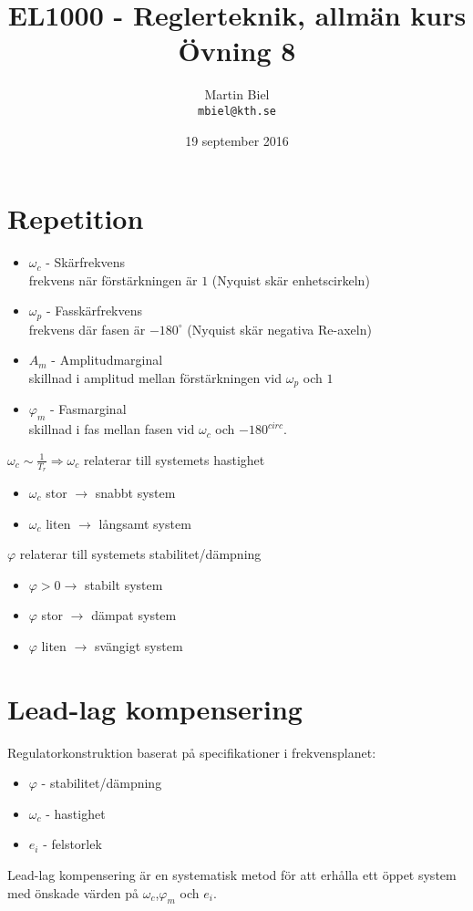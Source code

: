 \documentclass[12pt]{article}
\begin{document}
\begin{titlepage}
\author{Martin Biel \\ \texttt{mbiel@kth.se}}
\title{EL1000 - Reglerteknik, allmän kurs \\ \Large Övning 8}
\date{19 september 2016}
\end{titlepage}

\maketitle

\section*{Repetition}

\begin{itemize}
\item $\omega_c$ - Skärfrekvens \\
frekvens när förstärkningen är $1$ (Nyquist skär enhetscirkeln) 
\item $\omega_p$ - Fasskärfrekvens \\
frekvens där fasen är $-180^{\circ}$ (Nyquist skär negativa Re-axeln)
\item $A_m$ - Amplitudmarginal \\
skillnad i amplitud mellan förstärkningen vid $\omega_p$ och $1$
\item $\varphi_m$ - Fasmarginal \\
skillnad i fas mellan fasen vid $\omega_c$ och $-180^{circ}$.
\end{itemize}

$\omega_c \sim \frac{1}{T_r} \Rightarrow \omega_c$ relaterar till systemets hastighet
\begin{itemize}
\item $\omega_c$ stor $\rightarrow$ snabbt system
\item $\omega_c$ liten $\rightarrow$ långsamt system
\end{itemize}

$\varphi$ relaterar till systemets stabilitet/dämpning
\begin{itemize}
\item $\varphi > 0 \rightarrow$ stabilt system
\item $\varphi$ stor $\rightarrow$ dämpat system
\item $\varphi$ liten $\rightarrow$ svängigt system 
\end{itemize}

\section*{Lead-lag kompensering}
Regulatorkonstruktion baserat på specifikationer i frekvensplanet:
\begin{itemize}
\item $\varphi$ - stabilitet/dämpning
\item $\omega_c$ - hastighet
\item $e_i$ - felstorlek
\end{itemize}
Lead-lag kompensering är en systematisk metod för att erhålla ett öppet system med önskade värden på $\omega_c$,$\varphi_m$ och $e_i$.
\end{document}
